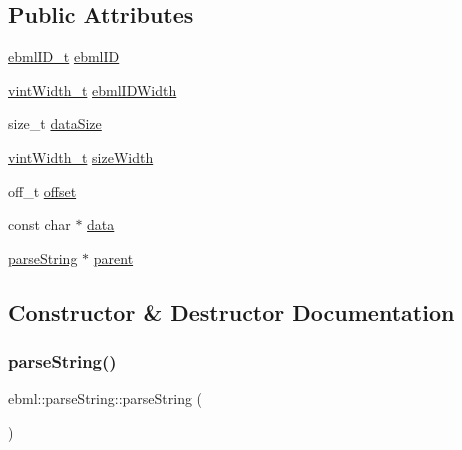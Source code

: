 \subsection*{Public Attributes}
\begin{DoxyCompactItemize}
\item 
\mbox{\hyperlink{namespaceebml_a86c5f604ddf12a74aa9812e997a58691}{ebml\+I\+D\+\_\+t}} \mbox{\hyperlink{classebml_1_1parseString_aabdb34cec8fd6d9ff5bea8061fa47d37}{ebml\+ID}}
\item 
\mbox{\hyperlink{namespaceebml_a2ccdfb60b23efb51fe07f9d066e23604}{vint\+Width\+\_\+t}} \mbox{\hyperlink{classebml_1_1parseString_a06f9f6557f9f6acb89cfdd1cf27d31f7}{ebml\+I\+D\+Width}}
\item 
size\+\_\+t \mbox{\hyperlink{classebml_1_1parseString_afcaff2526c0b0e95cffecc90d4c1cd88}{data\+Size}}
\item 
\mbox{\hyperlink{namespaceebml_a2ccdfb60b23efb51fe07f9d066e23604}{vint\+Width\+\_\+t}} \mbox{\hyperlink{classebml_1_1parseString_ab7d3455fc611ac13f43b99c340a09abc}{size\+Width}}
\item 
off\+\_\+t \mbox{\hyperlink{classebml_1_1parseString_a4f9a647d4a244db30f9546a3a1db3624}{offset}}
\item 
const char $\ast$ \mbox{\hyperlink{classebml_1_1parseString_a1e7b6fe6c4ee8b92ab36cc1f89b886c6}{data}}
\item 
\mbox{\hyperlink{classebml_1_1parseString}{parse\+String}} $\ast$ \mbox{\hyperlink{classebml_1_1parseString_ae70210ad2b2195b9c733bd68dc013560}{parent}}
\end{DoxyCompactItemize}


\subsection{Constructor \& Destructor Documentation}
\mbox{\label{classebml_1_1parseString_a3a10573e754e6c5b8bc9160f8840a891}} 
\subsubsection{\texorpdfstring{parse\+String()}{parseString()}\hspace{0.1cm}{\footnotesize\ttfamily [1/5]}}
{\footnotesize\ttfamily ebml\+::parse\+String\+::parse\+String (\begin{DoxyParamCaption}{ }\end{DoxyParamCaption})}

